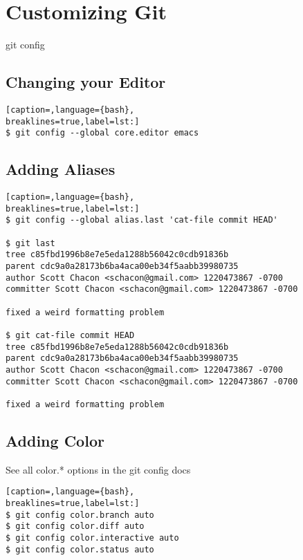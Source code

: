\section{Customizing Git}

git config

\subsection{Changing your Editor}
\lstset{basicstyle=\scriptsize, numbers=none, captionpos=b, tabsize=4}
\begin{lstlisting}[caption=,language={bash},
breaklines=true,label=lst:]
$ git config --global core.editor emacs
\end{lstlisting}

\subsection{Adding Aliases}
\lstset{basicstyle=\scriptsize, numbers=none, captionpos=b, tabsize=4}
\begin{lstlisting}[caption=,language={bash},
breaklines=true,label=lst:]
$ git config --global alias.last 'cat-file commit HEAD'

$ git last
tree c85fbd1996b8e7e5eda1288b56042c0cdb91836b
parent cdc9a0a28173b6ba4aca00eb34f5aabb39980735
author Scott Chacon <schacon@gmail.com> 1220473867 -0700
committer Scott Chacon <schacon@gmail.com> 1220473867 -0700

fixed a weird formatting problem

$ git cat-file commit HEAD
tree c85fbd1996b8e7e5eda1288b56042c0cdb91836b
parent cdc9a0a28173b6ba4aca00eb34f5aabb39980735
author Scott Chacon <schacon@gmail.com> 1220473867 -0700
committer Scott Chacon <schacon@gmail.com> 1220473867 -0700

fixed a weird formatting problem
\end{lstlisting}

\subsection{Adding Color}
See all color.* options in the git config docs
\lstset{basicstyle=\scriptsize, numbers=none, captionpos=b, tabsize=4}
\begin{lstlisting}[caption=,language={bash},
breaklines=true,label=lst:]
$ git config color.branch auto
$ git config color.diff auto
$ git config color.interactive auto
$ git config color.status auto
\end{lstlisting}

